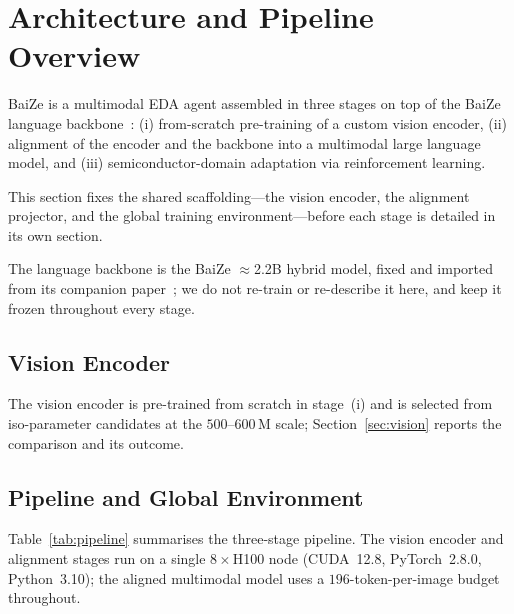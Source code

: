 ﻿\section{Architecture and Pipeline Overview}\label{sec:overview}

BaiZe is a multimodal EDA agent assembled in three stages on top of the BaiZe language backbone~\cite{baiZe-llm}: (i) from-scratch pre-training of a custom vision encoder, (ii) alignment of the encoder and the backbone into a multimodal large language model, and (iii) semiconductor-domain adaptation via reinforcement learning.

This section fixes the shared scaffolding---the vision encoder, the alignment projector, and the global training environment---before each stage is detailed in its own section.

The language backbone is the BaiZe $\approx$2.2B hybrid model, fixed and imported from its companion paper~\cite{baiZe-llm}; we do not re-train or re-describe it here, and keep it frozen throughout every stage.

\subsection{Vision Encoder}\label{sec:backbone-enc}
The vision encoder is pre-trained from scratch in stage~(i) and is selected from iso-parameter candidates at the $500$--$600$\,M scale; Section~\ref{sec:vision} reports the comparison and its outcome.

\subsection{Pipeline and Global Environment}\label{sec:pipeline}
Table~\ref{tab:pipeline} summarises the three-stage pipeline.
The vision encoder and alignment stages run on a single $8\times$H100 node (CUDA~12.8, PyTorch~2.8.0, Python~3.10); the aligned multimodal model uses a $196$-token-per-image budget throughout.

